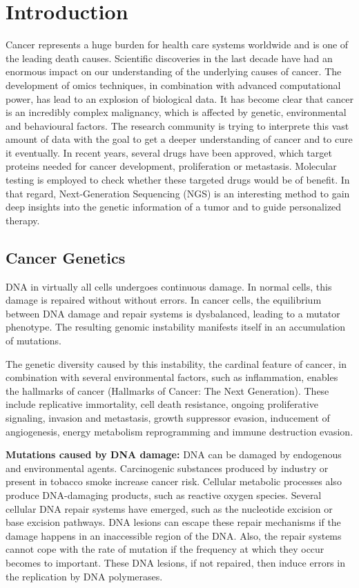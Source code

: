 \section{Introduction}

  Cancer represents a huge burden for health care systems worldwide and is one
  of the leading death causes. Scientific discoveries in the last decade have
  had an enormous impact on our understanding of the underlying causes of
  cancer. The development of omics techniques, in combination with advanced
  computational power, has lead to an explosion of biological data. It has
  become clear that cancer is an incredibly complex malignancy, which is
  affected by genetic, environmental and behavioural factors. The research
  community is trying to interprete this vast amount of data with the goal to
  get a deeper understanding of cancer and to cure it eventually. In recent
  years, several drugs have been approved, which target proteins needed for
  cancer development, proliferation or metastasis. Molecular testing is employed
  to check whether these targeted drugs would be of benefit. In that regard,
  Next-Generation Sequencing (NGS) is an interesting method to gain deep
  insights into the genetic information of a tumor and to guide personalized
  therapy.

  \subsection{Cancer Genetics}

    DNA in virtually all cells undergoes continuous damage. In normal cells, this
    damage is repaired without without errors. In cancer cells, the equilibrium
    between DNA damage and repair systems is dysbalanced, leading to a mutator
    phenotype. The resulting genomic instability manifests itself in an
    accumulation of mutations.

    The genetic diversity caused by this instability, the cardinal feature of
    cancer, in combination with several environmental factors, such as
    inflammation, enables the hallmarks of cancer (Hallmarks of Cancer: The Next
    Generation). These include replicative immortality, cell death resistance,
    ongoing proliferative signaling, invasion and metastasis, growth suppressor
    evasion, inducement of angiogenesis, energy metabolism reprogramming and
    immune destruction evasion.

    \textbf{Mutations caused by DNA damage:} DNA can be damaged by endogenous
    and environmental agents. Carcinogenic substances produced by industry or
    present in tobacco smoke increase cancer risk. Cellular metabolic processes
    also produce DNA-damaging products, such as reactive oxygen species. Several
    cellular DNA repair systems have emerged, such as the nucleotide excision or
    base excision pathways. DNA lesions can escape these repair mechanisms if
    the damage happens in an inaccessible region of the DNA. Also, the repair
    systems cannot cope with the rate of mutation if the frequency at which they
    occur becomes to important. These DNA lesions, if not repaired, then induce
    errors in the replication by DNA polymerases.

